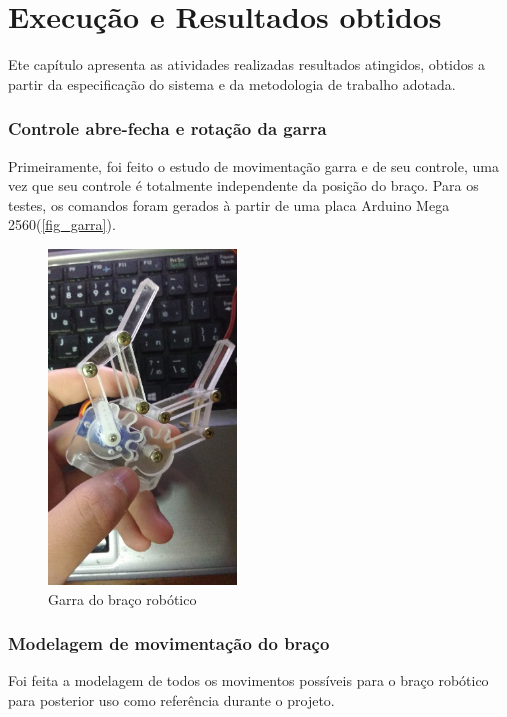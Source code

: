 	\chapter{Execução e Resultados obtidos}\label{cap-execucao}
	Ete capítulo apresenta as atividades realizadas resultados atingidos, obtidos a partir da especificação do sistema e da metodologia de trabalho adotada.
	
	\subsection{Controle abre-fecha e rotação da garra}\label{subsec-garra}
	Primeiramente, foi feito o estudo de movimentação garra e de seu controle, uma vez que seu controle é totalmente independente da posição do braço. Para os testes, os comandos foram gerados à partir de uma placa Arduino Mega 2560(\autoref{fig_garra}).\par

	\begin{figure}[h]
	\caption{\label{fig_garra} Garra do braço robótico }
	\begin{center}
		\includegraphics[width=50mm,scale=0.5]{IMG_20160523_203903430.jpg}	
	\end{center}
\end{figure}

	\subsection{Modelagem de movimentação do braço}\label{subsec-modelagem}
	Foi feita a modelagem de todos os movimentos possíveis para o braço robótico para posterior uso como referência durante o projeto.\par
